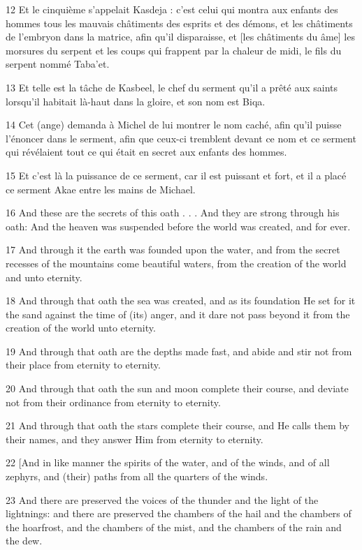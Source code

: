 \par 12 Et le cinquième s'appelait Kasdeja : c'est celui qui montra aux enfants des hommes tous les mauvais châtiments des esprits et des démons, et les châtiments de l'embryon dans la matrice, afin qu'il disparaisse, et [les châtiments du âme] les morsures du serpent et les coups qui frappent par la chaleur de midi, le fils du serpent nommé Taba'et.
\par 13 Et telle est la tâche de Kasbeel, le chef du serment qu'il a prêté aux saints lorsqu'il habitait là-haut dans la gloire, et son nom est Biqa.
\par 14 Cet (ange) demanda à Michel de lui montrer le nom caché, afin qu'il puisse l'énoncer dans le serment, afin que ceux-ci tremblent devant ce nom et ce serment qui révélaient tout ce qui était en secret aux enfants des hommes.
\par 15 Et c'est là la puissance de ce serment, car il est puissant et fort, et il a placé ce serment Akae entre les mains de Michael.
\par 16 And these are the secrets of this oath . . . And they are strong through his oath: And the heaven was suspended before the world was created, and for ever.
\par 17 And through it the earth was founded upon the water, and from the secret recesses of the mountains come beautiful waters, from the creation of the world and unto eternity.
\par 18 And through that oath the sea was created, and as its foundation He set for it the sand against the time of (its) anger, and it dare not pass beyond it from the creation of the world unto eternity.
\par 19 And through that oath are the depths made fast, and abide and stir not from their place from eternity to eternity.
\par 20 And through that oath the sun and moon complete their course, and deviate not from their ordinance from eternity to eternity.
\par 21 And through that oath the stars complete their course, and He calls them by their names, and they answer Him from eternity to eternity.
\par 22 [And in like manner the spirits of the water, and of the winds, and of all zephyrs, and (their) paths from all the quarters of the winds.
\par 23 And there are preserved the voices of the thunder and the light of the lightnings: and there are preserved the chambers of the hail and the chambers of the hoarfrost, and the chambers of the mist, and the chambers of the rain and the dew.

